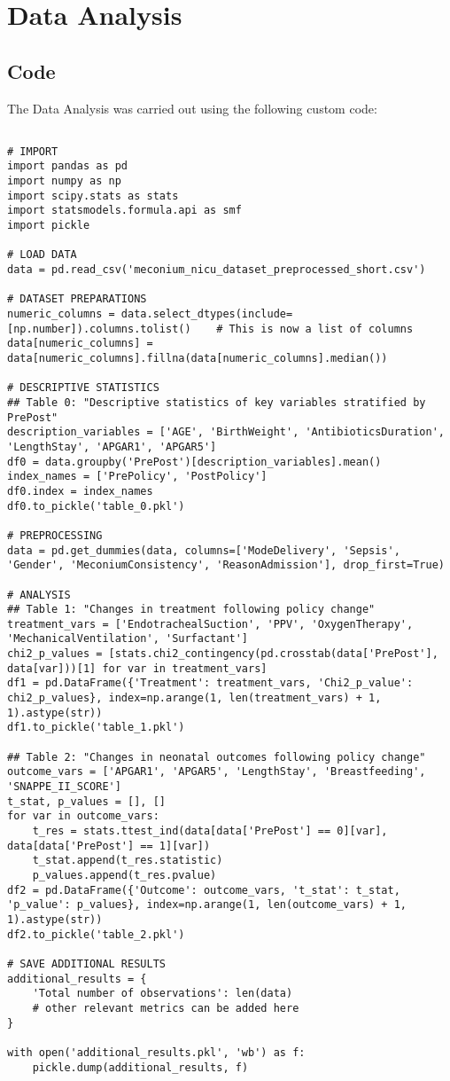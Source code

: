 \documentclass[11pt]{article}
\begin{document}
\begin{Verbatim}[tabsize=4]
\end{Verbatim}

\section{Data Analysis} \subsection{Code}The Data Analysis was carried out using the following custom code:

\begin{verbatim}

# IMPORT
import pandas as pd
import numpy as np
import scipy.stats as stats
import statsmodels.formula.api as smf
import pickle

# LOAD DATA
data = pd.read_csv('meconium_nicu_dataset_preprocessed_short.csv')

# DATASET PREPARATIONS
numeric_columns = data.select_dtypes(include=[np.number]).columns.tolist()    # This is now a list of columns
data[numeric_columns] = data[numeric_columns].fillna(data[numeric_columns].median())

# DESCRIPTIVE STATISTICS
## Table 0: "Descriptive statistics of key variables stratified by PrePost"
description_variables = ['AGE', 'BirthWeight', 'AntibioticsDuration', 'LengthStay', 'APGAR1', 'APGAR5']
df0 = data.groupby('PrePost')[description_variables].mean()
index_names = ['PrePolicy', 'PostPolicy']
df0.index = index_names
df0.to_pickle('table_0.pkl')

# PREPROCESSING
data = pd.get_dummies(data, columns=['ModeDelivery', 'Sepsis', 'Gender', 'MeconiumConsistency', 'ReasonAdmission'], drop_first=True)

# ANALYSIS
## Table 1: "Changes in treatment following policy change"
treatment_vars = ['EndotrachealSuction', 'PPV', 'OxygenTherapy', 'MechanicalVentilation', 'Surfactant']
chi2_p_values = [stats.chi2_contingency(pd.crosstab(data['PrePost'], data[var]))[1] for var in treatment_vars]
df1 = pd.DataFrame({'Treatment': treatment_vars, 'Chi2_p_value': chi2_p_values}, index=np.arange(1, len(treatment_vars) + 1, 1).astype(str))
df1.to_pickle('table_1.pkl')

## Table 2: "Changes in neonatal outcomes following policy change"
outcome_vars = ['APGAR1', 'APGAR5', 'LengthStay', 'Breastfeeding', 'SNAPPE_II_SCORE']
t_stat, p_values = [], []
for var in outcome_vars:
    t_res = stats.ttest_ind(data[data['PrePost'] == 0][var], data[data['PrePost'] == 1][var])
    t_stat.append(t_res.statistic)
    p_values.append(t_res.pvalue)
df2 = pd.DataFrame({'Outcome': outcome_vars, 't_stat': t_stat, 'p_value': p_values}, index=np.arange(1, len(outcome_vars) + 1, 1).astype(str))
df2.to_pickle('table_2.pkl')

# SAVE ADDITIONAL RESULTS
additional_results = {
    'Total number of observations': len(data) 
    # other relevant metrics can be added here
}

with open('additional_results.pkl', 'wb') as f:
    pickle.dump(additional_results, f)

\end{verbatim}
\end{document}
